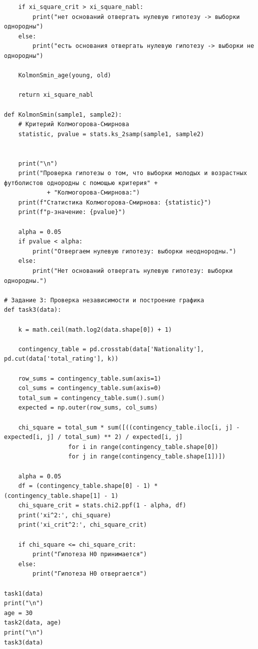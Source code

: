 \documentclass{article}
\begin{document}
\begin{verbatim}
    if xi_square_crit > xi_square_nabl:
        print("нет оснований отвергать нулевую гипотезу -> выборки однородны")
    else:
        print("есть основания отвергать нулевую гипотезу -> выборки не однородны")

    KolmonSmin_age(young, old)

    return xi_square_nabl

def KolmonSmin(sample1, sample2):
    # Критерий Колмогорова-Смирнова
    statistic, pvalue = stats.ks_2samp(sample1, sample2)


    print("\n")
    print("Проверка гипотезы о том, что выборки молодых и возрастных футболистов однородны с помощью критерия" +
            + "Колмогорова-Смирнова:")
    print(f"Статистика Колмогорова-Смирнова: {statistic}")
    print(f"p-значение: {pvalue}")

    alpha = 0.05
    if pvalue < alpha:
        print("Отвергаем нулевую гипотезу: выборки неоднородны.")
    else:
        print("Нет оснований отвергать нулевую гипотезу: выборки однородны.")

# Задание 3: Проверка независимости и построение графика
def task3(data):

    k = math.ceil(math.log2(data.shape[0]) + 1)

    contingency_table = pd.crosstab(data['Nationality'], pd.cut(data['total_rating'], k))

    row_sums = contingency_table.sum(axis=1)
    col_sums = contingency_table.sum(axis=0)
    total_sum = contingency_table.sum().sum()
    expected = np.outer(row_sums, col_sums)

    chi_square = total_sum * sum([((contingency_table.iloc[i, j] - expected[i, j] / total_sum) ** 2) / expected[i, j]
                  for i in range(contingency_table.shape[0])
                  for j in range(contingency_table.shape[1])])

    alpha = 0.05
    df = (contingency_table.shape[0] - 1) * (contingency_table.shape[1] - 1)
    chi_square_crit = stats.chi2.ppf(1 - alpha, df)
    print('xi^2:', chi_square)
    print('xi_crit^2:', chi_square_crit)

    if chi_square <= chi_square_crit:
        print("Гипотеза H0 принимается")
    else:
        print("Гипотеза H0 отвергается")

task1(data)
print("\n")
age = 30
task2(data, age)
print("\n")
task3(data)
      \end{verbatim}
\end{document}
